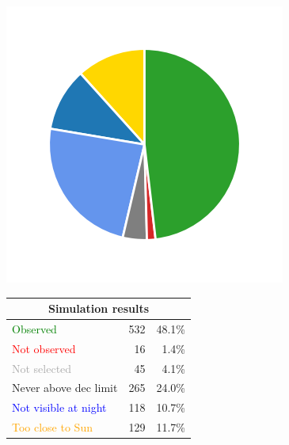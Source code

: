 \begin{colsection}
\begin{colsection}
\begin{figure}[p]
    \begin{center}
        \begin{minipage}[t]{0.15\textwidth}\vspace{0.6cm}
            \includegraphics[trim={.5cm 0 .5cm 0},clip,width=\linewidth]{images/gw_sims/1n4_pie.png}
        \end{minipage}
        \begin{minipage}[t]{0.45\textwidth}\vspace{0pt}
            \begin{tabular}{lrr}
                \multicolumn{3}{c}{\textbf{Simulation results}} \\
                \midrule
                \textcolor{Green}{Observed} & 532 & 48.1\% \\
                \textcolor{Red}{Not observed} & 16 & 1.4\% \\
                \textcolor{darkgray}{Not selected} & 45 & 4.1\% \\
                \textcolor{NavyBlue}{Never above dec limit} & 265 & 24.0\% \\
                \textcolor{Blue}{Not visible at night} & 118 & 10.7\% \\
                \textcolor{Orange}{Too close to Sun} & 129 & 11.7\% \\

\end{tabular}
\end{minipage}
\end{center}
\end{figure}
\end{colsection}
\end{colsection}
